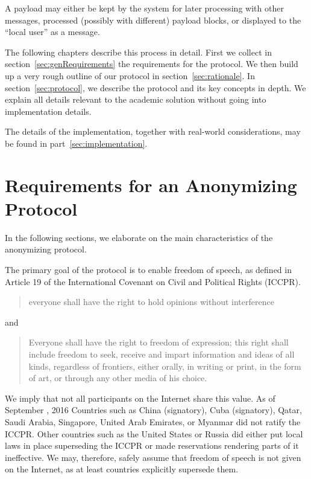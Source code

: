 A payload may either be kept by the system for later processing with other messages, processed (possibly with different) payload blocks, or displayed to the ``local user'' as a message.

The following chapters describe this process in detail. First we collect in section~\ref{sec:genRequirements} the requirements for the protocol. We then build up a very rough outline of our protocol in section~\ref{sec:rationale}. In section~\ref{sec:protocol}, we describe the protocol and its key concepts in depth. We explain all details relevant to the academic solution without going into implementation details.

The details of the implementation, together with real-world considerations, may be found in part~\ref{sec:implementation}.

\chapter{Requirements for an Anonymizing Protocol\label{sec:genRequirements}}
In the following sections, we elaborate on the main characteristics of the anonymizing protocol. 

The primary goal of the protocol is to enable freedom of speech, as defined in Article 19 of the International Covenant on Civil and Political Rights (ICCPR)\cite{iccpr}.
\begin{quote}
	everyone shall have the right to hold opinions without interference 
\end{quote}
and
\begin{quote}
	Everyone shall have the right to freedom of expression; this right shall include freedom to seek, receive and impart information and ideas of all kinds, regardless of frontiers, either orally, in writing or print, in the form of art, or through any other media of his choice.
\end{quote}

We imply that not all participants on the Internet share this value. As of September , 2016 Countries such as China (signatory), Cuba (signatory), Qatar, Saudi Arabia, Singapore, United Arab Emirates, or Myanmar did not ratify the ICCPR. Other countries such as the United States or Russia did either put local laws in place superseding the ICCPR or made reservations rendering parts of it ineffective. We may, therefore, safely assume that freedom of speech is not given on the Internet, as at least countries explicitly supersede them.


